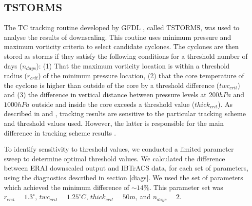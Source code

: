 \subsection{TSTORMS}
\label{tstorms}
The TC tracking routine developed by GFDL  \cite{tc_algo}, called TSTORMS, was used to analyse the results of downscaling. This routine uses minimum pressure and maximum vorticity criteria to select candidate cyclones. The cyclones are then stored as storms if they satisfy the following conditions for a threshold number of days ($n_{days}$): (1) That the maximum vorticity location is within a threshold radius ($r_{crit}$) of the minimum pressure location, (2) that the core temperature of the cyclone is higher than outside of the core by a threshold difference ($twc_{crit}$) and (3) the difference in vertical distance between pressure levels at $200hPa$ and $1000hPa$ outside and inside the core exceeds a threshold value ($thick_{crit}$). As described in \cite{kerry_clivar} and \cite{tc_algo}, tracking results are sensitive to the particular tracking scheme and threshold values used. However, the latter is responsible for the main difference in tracking scheme results \cite{tc_track}. 
\par
To identify sensitivity to threshold values, we conducted a limited parameter sweep to determine optimal threshold values. We calculated the difference between ERAI downscaled output and IBTrACS data, for each set of parameters, using the diagnostics described in section \ref{diags}. We used the set of parameters which achieved the minimum difference of $\sim14\%$. This parameter set was $r_{crit} = 1.3^{\circ}$, $twc_{crit} = 1.25^{\circ}C$, $thick_{crit} = 50m$, and $n_{days} = 2$.  

